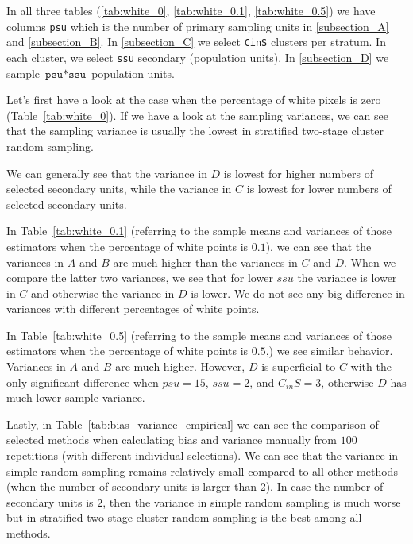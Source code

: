 \documentclass{article}
\begin{document}

In all three tables (\ref{tab:white_0}, \ref{tab:white_0.1}, \ref{tab:white_0.5}) we have columns \texttt{psu} which is the number of primary sampling units in \ref{subsection_A} and \ref{subsection_B}. In \ref{subsection_C} we select \texttt{CinS} clusters per stratum. In each cluster, we select \texttt{ssu} secondary (population units). In \ref{subsection_D} we sample $\texttt{psu} * \texttt{ssu}$ population units.

Let's first have a look at the case when the percentage of white pixels is zero (Table~\ref{tab:white_0}). If we have a look at the sampling variances, we can see that the sampling variance is usually the lowest in stratified two-stage cluster random sampling. 

We can generally see that the variance in $D$ is lowest for higher numbers of selected secondary units, while the variance in $ C$ is lowest for lower numbers of selected secondary units.


In Table~\ref{tab:white_0.1} (referring to the sample means and variances of those estimators when the percentage of white points is $0.1$), we can see that the variances in $A$ and $B$ are much higher than the variances in $C$ and $D$. When we compare the latter two variances, we see that for lower $ssu$ the variance is lower in $C$ and otherwise the variance in $D$ is lower. We do not see any big difference in variances with different percentages of white points.

In Table~\ref{tab:white_0.5} (referring to the sample means and variances of those estimators when the percentage of white points is $0.5$,) we see similar behavior. Variances in $A$ and $B$ are much higher. However, $D$ is superficial to $C$ with the only significant difference when $psu=15$, $ssu=2$, and $C_{in}S = 3$, otherwise $D$ has much lower sample variance.

Lastly, in Table~\ref{tab:bias_variance_empirical} we can see the comparison of selected methods when calculating bias and variance manually from $100$ repetitions (with different individual selections). We can see that the variance in simple random sampling remains relatively small compared to all other methods (when the number of secondary units is larger than 2). In case the number of secondary units is $2$, then the variance in simple random sampling is much worse but in stratified two-stage cluster random sampling is the best among all methods. 
\end{document}
